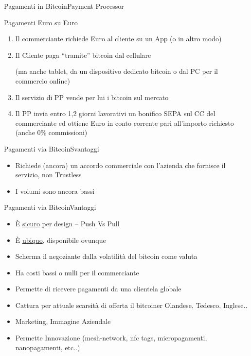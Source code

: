 \documentclass[english,compress]{beamer}
\begin{document}
\begin{frame}{Pagamenti in Bitcoin}{Payment Processor}
 \begin{exampleblock}{Pagamenti Euro su Euro}
  \begin{enumerate}
   \item Il commerciante richiede Euro al cliente su un App (o in altro modo)
   
   \item Il Cliente paga ``tramite'' bitcoin dal cellulare \begin{small}(ma anche tablet, da un dispositivo
	 dedicato bitcoin o dal PC per il commercio online)\end{small}
 \item Il servizio di PP vende per lui i bitcoin sul mercato
 \item Il PP invia entro 1,2 giorni lavorativi un bonifico SEPA sul CC del commerciante
   ed ottiene Euro in conto corrente pari all'importo richiesto (anche 0\% commissioni)
  \end{enumerate}

 \end{exampleblock}

\end{frame}

\begin{frame}{Pagamenti via Bitcoin}{Svantaggi}

 \begin{itemize}
   \item Richiede (ancora) un accordo commerciale con l'azienda che fornisce il servizio, non Trustless
   \item I volumi sono ancora bassi
  \end{itemize}

\end{frame}

\begin{frame}{Pagamenti via Bitcoin}{Vantaggi}
 \begin{itemize}
  \item È \href{http://miguelmoreno.net/wp-content/uploads/2013/05/fYFBsqp.jpg}{sicuro} per design -- Push Vs Pull
  \item È \href{http://pagoinbit.it/pad/}{ubiquo}, disponibile ovunque
  \item Scherma il negoziante dalla volatilità del bitcoin come valuta
  \item Ha costi bassi o nulli per il commerciante
  \item Permette di ricevere pagamenti da una clientela globale
  \item Cattura per attuale scarsità di offerta il bitcoiner Olandese, Tedesco, Inglese..
  \item Marketing, Immagine Aziendale
  \item Permette Innovazione (mesh-network, nfc tags, micropagamenti, nanopagamenti, etc..)
  \end{itemize}

\end{frame}
\end{document}
